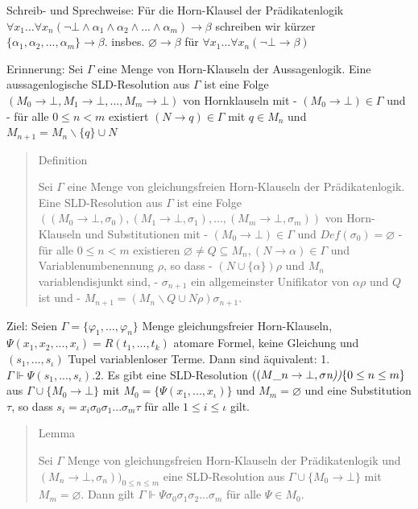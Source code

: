 \documentclass[a4paper]{article}
\begin{document}
\begin{multicols}{3}
  Schreib- und Sprechweise: Für die Horn-Klausel der Prädikatenlogik
  $\forall x_1...\forall x_n(\lnot\bot \wedge \alpha_1 \wedge \alpha_2 \wedge...\wedge \alpha_m)\rightarrow\beta$
  schreiben wir kürzer
  $\{\alpha_1,\alpha_2,...,\alpha_m\}\rightarrow\beta$. insbes.
  $\varnothing\rightarrow\beta$ für
  $\forall x_1...\forall x_n(\lnot\bot\rightarrow\beta)$

  Erinnerung: Sei $\Gamma$ eine Menge von Horn-Klauseln der Aussagenlogik.
  Eine aussagenlogische SLD-Resolution aus $\Gamma$ ist eine Folge
  $(M_0 \rightarrow\bot,M_1 \rightarrow\bot,...,M_m\rightarrow\bot)$ von
  Hornklauseln mit - $(M_0\rightarrow\bot)\in\Gamma$ und - für alle
  $0\leq n<m$ existiert $(N\rightarrow q)\in\Gamma$ mit $q\in M_n$ und
  $M_{n+1} =M_n\backslash\{q\}\cup N$

  \begin{quote}
    Definition

    Sei $\Gamma$ eine Menge von gleichungsfreien Horn-Klauseln der
    Prädikatenlogik. Eine SLD-Resolution aus $\Gamma$ ist eine Folge
    $((M_0\rightarrow\bot,\sigma_0),(M_1\rightarrow\bot,\sigma_1),...,(M_m\rightarrow\bot,\sigma_m))$
    von Horn-Klauseln und Substitutionen mit -
    $(M_0\rightarrow\bot)\in\Gamma$ und $Def(\sigma_0)=\varnothing$ - für
    alle $0\leq n<m$ existieren
    $\varnothing\not=Q\subseteq M_n,(N\rightarrow\alpha)\in\Gamma$ und
    Variablenumbenennung $\rho$, so dass - $(N\cup\{\alpha\})\rho$ und $M_n$
    variablendisjunkt sind, - $\sigma_{n+1}$ ein allgemeinster Unifikator
    von $\alpha\rho$ und $Q$ ist und -
    $M_{n+1} = (M_n\backslash Q\cup N\rho)\sigma_{n+1}$.
  \end{quote}

  Ziel: Seien $\Gamma=\{\varphi_1,...,\varphi_n\}$ Menge gleichungsfreier
  Horn-Klauseln, $\Psi(x_1,x_2 ,...,x_{\iota}) =R(t_1 ,...,t_k)$ atomare
  Formel, keine Gleichung und $(s_1,...,s_{\iota})$ Tupel variablenloser
  Terme. Dann sind äquivalent: 1.
  $\Gamma\Vdash\Psi(s_1,...,s_{\iota}). 2.$ Es gibt eine SLD-Resolution $((M\_n\rightarrow\bot,\sigma\emph{n))}\{0\leq n\leq m\}$ aus $\Gamma\cup\{M_0\rightarrow\bot\}$ mit
  $M_0=\{\Psi(x_1,...,x_{\iota})\}$ und $M_m=\varnothing$ und eine
  Substitution $\tau$, so dass $s_i=x_i\sigma_0 \sigma_1 ...\sigma_m\tau$
  für alle $1\leq i\leq \iota$ gilt.

  \begin{quote}
    Lemma

    Sei $\Gamma$ Menge von gleichungsfreien Horn-Klauseln der
    Prädikatenlogik und $(M_n \rightarrow\bot,\sigma_n))_{0\leq n\leq m}$
    eine SLD-Resolution aus $\Gamma\cup\{M_0\rightarrow\bot\}$ mit
    $M_m=\varnothing$. Dann gilt
    $\Gamma\Vdash\Psi\sigma_0 \sigma_1\sigma_2...\sigma_m$ für alle
    $\Psi\in M_0$.
  \end{quote}


\end{multicols}
\end{document}
